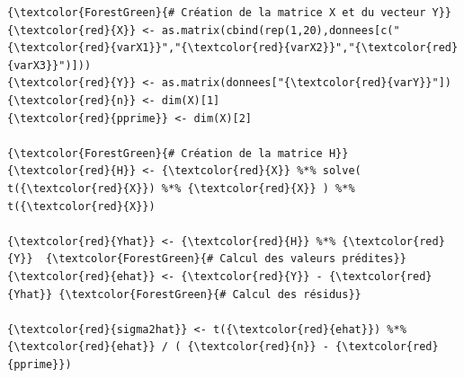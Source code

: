 \documentclass[letter, 11pt]{article}
\begin{document}
\begin{Verbatim}
{\textcolor{ForestGreen}{# Création de la matrice X et du vecteur Y}}
{\textcolor{red}{X}} <- as.matrix(cbind(rep(1,20),donnees[c("{\textcolor{red}{varX1}}","{\textcolor{red}{varX2}}","{\textcolor{red}{varX3}}")]))
{\textcolor{red}{Y}} <- as.matrix(donnees["{\textcolor{red}{varY}}"])
{\textcolor{red}{n}} <- dim(X)[1]
{\textcolor{red}{pprime}} <- dim(X)[2]

{\textcolor{ForestGreen}{# Création de la matrice H}}
{\textcolor{red}{H}} <- {\textcolor{red}{X}} %*% solve( t({\textcolor{red}{X}}) %*% {\textcolor{red}{X}} ) %*% t({\textcolor{red}{X}})

{\textcolor{red}{Yhat}} <- {\textcolor{red}{H}} %*% {\textcolor{red}{Y}}  {\textcolor{ForestGreen}{# Calcul des valeurs prédites}}
{\textcolor{red}{ehat}} <- {\textcolor{red}{Y}} - {\textcolor{red}{Yhat}} {\textcolor{ForestGreen}{# Calcul des résidus}}

{\textcolor{red}{sigma2hat}} <- t({\textcolor{red}{ehat}}) %*% {\textcolor{red}{ehat}} / ( {\textcolor{red}{n}} - {\textcolor{red}{pprime}})
\end{Verbatim}
\end{document}
